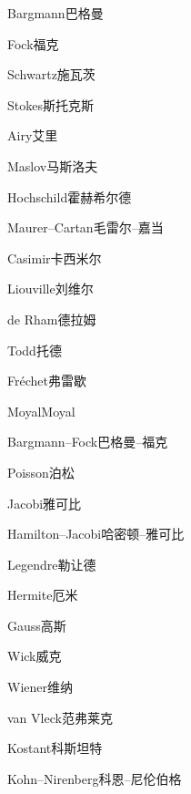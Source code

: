 \begin{multicols}{2}
Bargmann\hspace{0.9em}巴格曼\par
Fock\hspace{0.9em}福克\par
Schwartz\hspace{0.9em}施瓦茨\par
Stokes\hspace{0.9em}斯托克斯\par
Airy\hspace{0.9em}艾里\par
Maslov\hspace{0.9em}马斯洛夫\par
Hochschild\hspace{0.9em}霍赫希尔德\par
Maurer–Cartan\hspace{0.9em}毛雷尔–嘉当\par
Casimir\hspace{0.9em}卡西米尔\par
Liouville\hspace{0.9em}刘维尔\par
de Rham\hspace{0.9em}德拉姆\par
Todd\hspace{0.9em}托德\par
Fréchet\hspace{0.9em}弗雷歇\par
Moyal\hspace{0.9em}Moyal\par
Bargmann–Fock\hspace{0.9em}巴格曼–福克\par
Poisson\hspace{0.9em}泊松\par
Jacobi\hspace{0.9em}雅可比\par
Hamilton–Jacobi\hspace{0.9em}哈密顿–雅可比\par
Legendre\hspace{0.9em}勒让德\par
Hermite\hspace{0.9em}厄米\par
Gauss\hspace{0.9em}高斯\par
Wick\hspace{0.9em}威克\par
Wiener\hspace{0.9em}维纳\par
van Vleck\hspace{0.9em}范弗莱克\par
Kostant\hspace{0.9em}科斯坦特\par
Kohn–Nirenberg\hspace{0.9em}科恩–尼伦伯格\par
\end{multicols}

